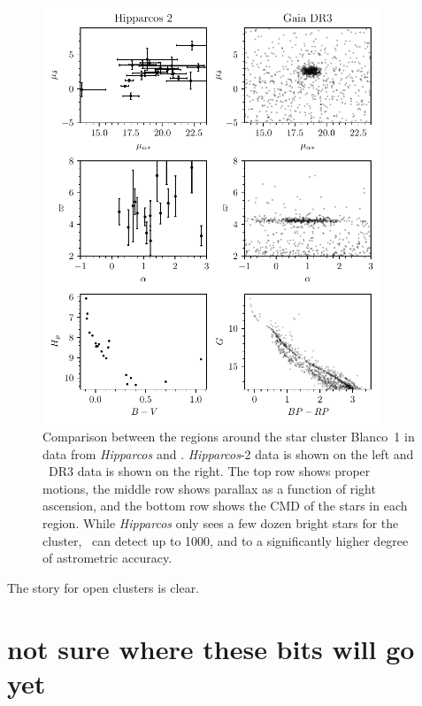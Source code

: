 \begin{figure}[tb]
	\centering
	\includegraphics[width=0.9\textwidth]{fig/c1/gaia_hipparcos_oc_comparison.pdf}
	\caption[Comparison between the regions around the star cluster Blanco~1 in data from \emph{Hipparcos} and \gaia]{Comparison between the regions around the star cluster Blanco~1 in data from \emph{Hipparcos} and \gaia. \emph{Hipparcos}-2 data \citep{vanleeuwen_hipparcos_new_2007} is shown on the left and \gaia\ DR3 data \citep{gaia_collaboration_gaia_2022} is shown on the right. The top row shows proper motions, the middle row shows parallax as a function of right ascension, and the bottom row shows the CMD of the stars in each region. While \emph{Hipparcos} only sees a few dozen bright stars for the cluster, \gaia\ can detect up to 1000, and to a significantly higher degree of astrometric accuracy.}
	\label{fig:intro:history:gaia_blanco_1}
\end{figure}

The story for open clusters is clear. 





\section{not sure where these bits will go yet}


